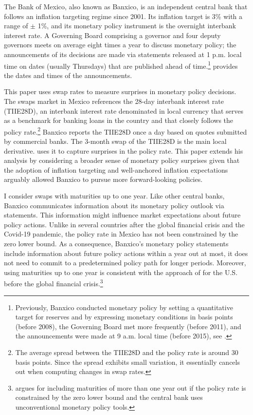 \documentclass[a4paper, 12pt]{article}
\providecommand{\tiie}{TIIE28D}
\begin{document}
The Bank of Mexico, also known as Banxico, is an independent central bank that follows an inflation targeting regime since 2001. 
Its inflation target is 3\% with a range of \(\pm\) 1\%, and its monetary policy instrument is the overnight interbank interest rate. 
A Governing Board comprising a governor and four deputy governors meets on average eight times a year to discuss monetary policy; the announcements of its decisions are made via statements released at 1 p.m. local time on dates (usually Thursdays) that are published ahead of time.\footnote{Previously, Banxico conducted monetary policy by setting a quantitative target for reserves and by expressing monetary conditions in basis points (before 2008), the Governing Board met more frequently (before 2011), and the announcements were made at 9 a.m. local time (before 2015), see \textcite{Solis:FX}.} 
\textcite{Solis:FX} provides the dates and times of the announcements.

This paper uses swap rates to measure surprises in monetary policy decisions. 
The swaps market in Mexico references the 28-day interbank interest rate (\tiie), an interbank interest rate denominated in local currency that serves as a benchmark for banking loans in the country and that closely follows the policy rate.\footnote{The average spread between the \tiie{} and the policy rate is around 30 basis points. Since the spread exhibits small variation, it essentially cancels out when computing changes in swap rates.} 
Banxico reports the \tiie{} once a day based on quotes submitted by commercial banks. 
The 3-month swap of the \tiie{} is the main local derivative. 
\textcite{Solis:FX} uses it to capture surprises in the policy rate. 
This paper extends his analysis by considering a broader sense of monetary policy surprises given that the adoption of inflation targeting and well-anchored inflation expectations arguably allowed Banxico to pursue more forward-looking policies. 

I consider swaps with maturities up to one year. 
Like other central banks, Banxico communicates information about its monetary policy outlook via statements. 
This information might influence market expectations about future policy actions. 
Unlike in several countries after the global financial crisis and the Covid-19 pandemic, the policy rate in Mexico has 
not been constrained by the zero lower bound. As a consequence, Banxico's monetary policy statements include information about future policy actions within a year out at most, it does not need to commit to a predetermined policy path for longer periods. 
Moreover, using maturities up to one year is consistent with the approach of \textcite{GSS:2005a} for the U.S. before the global financial crisis.\footnote{ \textcite{Swanson:2021} argues for including maturities of more than one year out if the policy rate is constrained by the zero lower bound and the central bank uses unconventional monetary policy tools.} 
\end{document}
